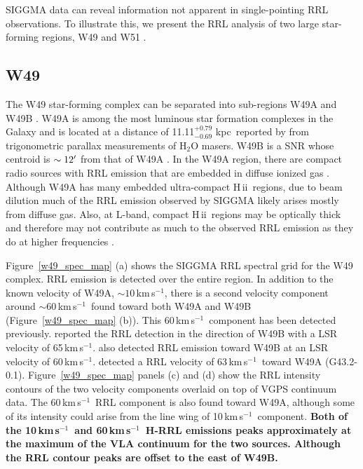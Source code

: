 \documentclass[manuscript]{aastex61}
\newcommand{\hii}{{\rm H\,}{{\sc ii}}}
\newcommand{\kms}{\,km\,s$^{-1}$}
\newcommand{\kpc}{\,kpc}
\begin{document}
SIGGMA data can reveal information not apparent in single-pointing RRL observations.
To illustrate this, we present the RRL analysis of two large star-forming regions, W49 and W51 \citep{Westerhout1958}.

\subsection{W49}
The W49 star-forming complex can be separated into sub-regions W49A and W49B \citep{Mezger1967c}.
W49A is among the most luminous star formation complexes in the Galaxy and is located at a distance of 11.11$^{+0.79}_{-0.69}$\,\kpc\ reported by \citet{Zhang2013} from trigonometric parallax measurements of H$_{2}$O masers.
W49B is a SNR whose centroid is $\sim12\mbox{$^\prime$}$ from that of W49A \citep{Lacey2001}.
In the W49A region, there are compact radio sources with RRL emission that are embedded in diffuse ionized gas \citep{Depree1997,Depree2003}.
Although W49A has many embedded ultra-compact \hii\ regions, due to beam dilution much of the RRL emission observed by SIGGMA likely arises mostly from diffuse gas.
Also, at L-band, compact \hii\ regions may be optically thick and therefore may not contribute as much to the observed RRL emission as they do at higher frequencies \textbf{\citep{Kim2001,Wood1989}}.

Figure~\ref{w49_spec_map} (a) shows the SIGGMA RRL spectral grid for the W49 complex.
RRL emission is detected over the entire region.
In addition to the known velocity of W49A, $\sim10$\kms, there is a second velocity component around $\sim60$\kms\ found toward both W49A and W49B (Figure~\ref{w49_spec_map} (b)).
This 60\kms\ component has been detected previously.
\citet{Downes1974} reported the RRL detection in the direction of W49B with a LSR velocity of 65\kms.
\citet{Pankonin1975} also detected RRL emission toward W49B at an LSR velocity of 60\kms.
\citet{Anantharamaiah1986} detected a RRL velocity of 63\kms\ toward W49A (G43.2-0.1).
Figure~\ref{w49_spec_map} panels (c) and (d) show the RRL intensity contours of the two velocity components overlaid on top of VGPS continuum data.
The 60\kms\ RRL component is also found toward W49A, although some of its intensity could arise from the line wing of 10\kms\ component.
\textbf{Both of the 10\kms\ and 60\kms\ H-RRL emissions peaks approximately at the maximum of the VLA continuum for the two sources.
Although the RRL contour peaks are offset to the east of W49B.}
\end{document}
